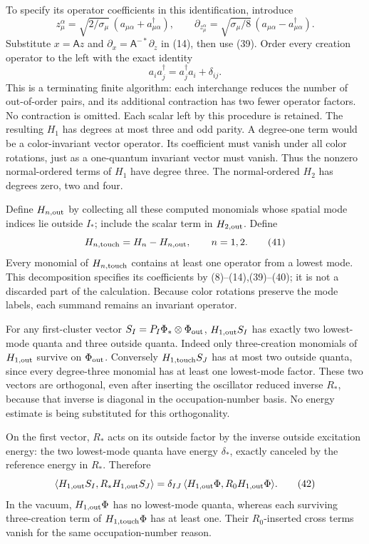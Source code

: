 \documentclass[
  11pt,
]{article}
\begin{document}
To specify its operator coefficients in this identification, introduce
\[
 z_\mu^\alpha=\sqrt{2/\sigma_\mu}\,
                  (a_{\mu\alpha}+a_{\mu\alpha}^\dagger),\qquad
 \partial_{z_\mu^\alpha}=\sqrt{\sigma_\mu/8}\,
                  (a_{\mu\alpha}-a_{\mu\alpha}^\dagger).
 \tag{39}
\] Substitute \(x=\mathsf A z\) and
\(\partial_x=\mathsf A^{-*}\partial_z\) in (14), then use (39). Order
every creation operator to the left with the exact identity \[
 a_i a_j^\dagger=a_j^\dagger a_i+\delta_{ij}.
 \tag{40}
\] This is a terminating finite algorithm: each interchange reduces the
number of out-of-order pairs, and its additional contraction has two
fewer operator factors. No contraction is omitted. Each scalar left by
this procedure is retained. The resulting \(H_1\) has degrees at most
three and odd parity. A degree-one term would be a color-invariant
vector operator. Its coefficient must vanish under all color rotations,
just as a one-quantum invariant vector must vanish. Thus the nonzero
normal-ordered terms of \(H_1\) have degree three. The normal-ordered
\(H_2\) has degrees zero, two and four.

Define \(H_{n,\rm out}\) by collecting all these computed monomials
whose spatial mode indices lie outside \(I_*\); include the scalar term
in \(H_{2,\rm out}\). Define \[
 H_{n,\rm touch}=H_n-H_{n,\rm out},\qquad n=1,2.
 \tag{41}
\] Every monomial of \(H_{n,\rm touch}\) contains at least one operator
from a lowest mode. This decomposition specifies its coefficients by
(8)--(14),(39)--(40); it is not a discarded part of the calculation.
Because color rotations preserve the mode labels, each summand remains
an invariant operator.

For any first-cluster vector \(S_I=P_I\Phi_*\otimes\Phi_{\rm out}\),
\(H_{1,\rm out}S_I\) has exactly two lowest-mode quanta and three
outside quanta. Indeed only three-creation monomials of
\(H_{1,\rm out}\) survive on \(\Phi_{\rm out}\). Conversely
\(H_{1,\rm touch}S_J\) has at most two outside quanta, since every
degree-three monomial has at least one lowest-mode factor. These two
vectors are orthogonal, even after inserting the oscillator reduced
inverse \(R_*\), because that inverse is diagonal in the
occupation-number basis. No energy estimate is being substituted for
this orthogonality.

On the first vector, \(R_*\) acts on its outside factor by the inverse
outside excitation energy: the two lowest-mode quanta have energy
\(\delta_*\), exactly canceled by the reference energy in \(R_*\).
Therefore \[
 \langle H_{1,\rm out}S_I,R_*H_{1,\rm out}S_J\rangle
 =\delta_{IJ}\,
       \langle H_{1,\rm out}\Phi,R_0H_{1,\rm out}\Phi\rangle.
 \tag{42}
\] In the vacuum, \(H_{1,\rm out}\Phi\) has no lowest-mode quanta,
whereas each surviving three-creation term of \(H_{1,\rm touch}\Phi\)
has at least one. Their \(R_0\)-inserted cross terms vanish for the same
occupation-number reason.
\end{document}
